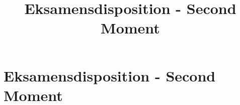 
\title{Eksamensdisposition - Second Moment}


\maketitle



\newpage
\section{Eksamensdisposition - Second Moment}







